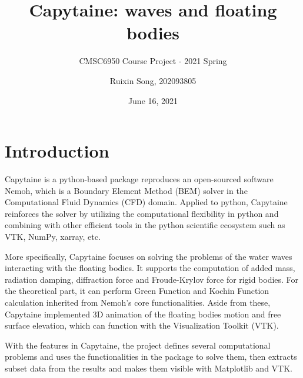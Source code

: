 \documentclass{article}
\title{Capytaine: waves and floating bodies}
\subtitle{CMSC6950 Course Project - 2021 Spring}
\author{Ruixin Song, 202093805}
\date{June 16, 2021}
\begin{document}
\maketitle

\section{Introduction}
Capytaine\cite{Ancellin2019} is a python-based package reproduces an open-sourced software Nemoh, which is a Boundary Element Method (BEM) solver in the Computational Fluid Dynamics (CFD) domain. Applied to python, Capytaine reinforces the solver by utilizing the computational flexibility in python and combining with other efficient tools in the python scientific ecosystem such as VTK, NumPy, xarray, etc. 

More specifically, Capytaine focuses on solving the problems of the water waves interacting with the floating bodies. It supports the computation of added mass, radiation damping, diffraction force and Froude-Krylov force for rigid bodies. For the theoretical part, it can perform Green Function and Kochin Function calculation inherited from Nemoh's core functionalities\cite{documentation}. Aside from these, Capytaine implemented 3D animation of the floating bodies motion and free surface elevation, which can function with the Visualization Toolkit (VTK).

With the features in Capytaine, the project defines several computational problems and uses the functionalities in the package to solve them, then extracts subset data from the results and makes them visible with Matplotlib and VTK.
\end{document}
